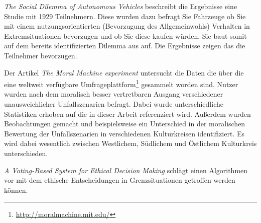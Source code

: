 \textit{The Social Dilemma of Autonomous Vehicles} \cite{socialDilemma} beschreibt die Ergebnisse eine Studie mit 1929 Teilnehmern. Diese wurden dazu befragt Sie Fahrzeuge ob Sie mit einem nutzungsorientierten (Bevorzugung des Allgemeinwohls) Verhalten in Extremsituationen bevorzugen und ob Sie diese kaufen würden. Sie baut somit auf dem bereits identifizierten Dilemma aus \cite{roadblocks} auf. Die Ergebnisse zeigen das die Teilnehmer bevorzugen.



Der Artikel \textit{The Moral Machine experiment} \cite{moralMachine} untersucht die Daten die über die eine weltweit verfügbare Umfrageplattform\footnote{\url{http://moralmachine.mit.edu/}} gesammelt worden sind. Nutzer wurden nach dem moralisch besser vertretbaren Ausgang verschiedener unausweichlicher Unfallszenarien befragt. Dabei wurde unterschiedliche Statistiken erhoben auf die in dieser Arbeit referenziert wird. Außerdem wurden Beobachtungen gemacht und beispielsweise ein Unterschied in der moralischen Bewertung der Unfallszenarien in verschiedenen Kulturkreisen identifiziert. Es wird dabei wesentlich zwischen Westlichem, Südlichem und Östlichem Kulturkreis unterschieden.


\textit{A Voting-Based System for Ethical Decision Making} \cite{votingBasedSystem} schlägt einen Algorithmen vor mit dem ethische Entscheidungen in Grenzsituationen getroffen werden können.